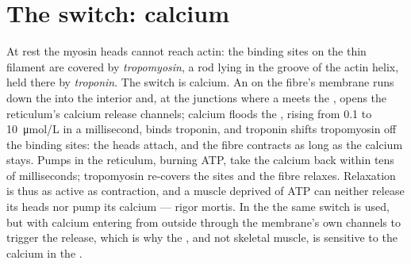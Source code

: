 \section{The switch: calcium}

\begin{proposition}\label{prop:b2:muscle-movement:coupling}
At rest the myosin heads cannot reach actin: the binding sites on
the thin filament are covered by \emph{tropomyosin}, a rod lying
in the groove of the actin helix, held there by \emph{troponin}.
The switch is calcium. An  on the fibre's membrane
runs down the  into the interior and, at the junctions
where a  meets the , opens the
reticulum's calcium release channels; calcium floods the ,
rising from \qty{0.1}{} to \qty{10}{\micro mol/L} in a millisecond,
binds troponin, and troponin shifts tropomyosin off the binding
sites: the heads attach, and the fibre contracts as long as the
calcium stays. Pumps in the reticulum, burning ATP, take the
calcium back within tens of milliseconds; tropomyosin re-covers the
sites and the fibre relaxes. Relaxation is thus as active as
contraction, and a muscle deprived of ATP can neither release its
heads nor pump its calcium --- rigor mortis. In the  the same
switch is used, but with calcium entering from outside through the
membrane's own channels to trigger the release, which is why the
, and not skeletal muscle, is sensitive to the calcium in the
.
\end{proposition}

